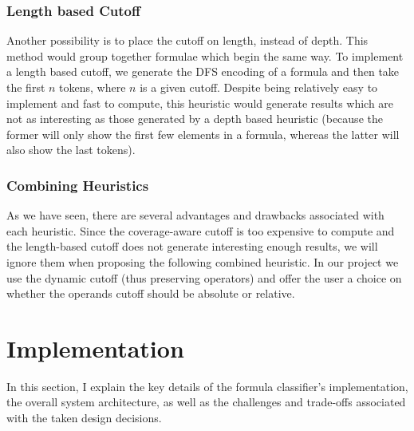 \documentclass[a4paper,oneside]{article}
\begin{document}
\subsubsection{Length based Cutoff}\label{subsubsec:length_based_cutoff}
Another possibility is to place the cutoff on length, instead of depth. This
method would group together formulae which begin the same way. To implement
a length based cutoff, we generate the DFS encoding of a formula and then take
the first $n$ tokens, where $n$ is a given cutoff. Despite being relatively
easy to implement and fast to compute, this heuristic would generate results
which are not as interesting as those generated by a depth based heuristic
(because the former will only show the first few elements in a formula, whereas
the latter will also show the last tokens).

\subsubsection{Combining Heuristics}\label{subsubsec:combining_cutoffs}
As we have seen, there are several advantages and drawbacks associated with
each heuristic. Since the coverage-aware cutoff is too expensive to compute and
the length-based cutoff does not generate interesting enough results, we
will ignore them when proposing the following combined heuristic. In our
project we use the dynamic cutoff (thus preserving operators) and offer the
user a choice on whether the operands cutoff should be absolute or relative.


\section{Implementation}\label{sec:implementation}

In this section, I explain the key details of the formula classifier's
implementation, the overall system architecture, as well as the challenges and
trade-offs associated with the taken design decisions.
\end{document}
